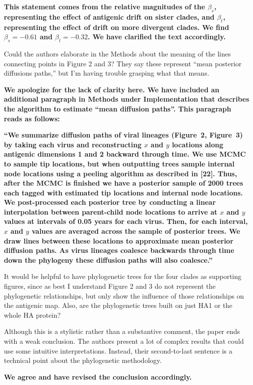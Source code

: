 \documentclass[11pt,oneside,letterpaper]{article}
\begin{document}
\textbf{This statement comes from the relative magnitudes of the $\beta_s$, representing the effect of antigenic drift on sister clades, and $\beta_t$, representing the effect of drift on more divergent clades.  We find $\beta_s = -0.61$ and $\beta_t = -0.32$.  We have clarified the text accordingly.}

Could the authors elaborate in the Methods about the meaning of the lines connecting points in Figure 2 and 3? They say these represent ``mean posterior diffusions paths,'' but I'm having trouble grasping what that means.

\textbf{We apologize for the lack of clarity here.  We have included an additional paragraph in Methods under Implementation that describes the algorithm to estimate ``mean diffusion paths''.  This paragraph reads as follows:}

\textbf{``We summarize diffusion paths of viral lineages (Figure~2, Figure~3) by taking each virus and reconstructing $x$ and $y$ locations along antigenic dimensions 1 and 2 backward through time.
We use MCMC to sample tip locations, but when outputting trees sample internal node locations using a peeling algorithm as described in [22].
Thus, after the MCMC is finished we have a posterior sample of 2000 trees each tagged with estimated tip locations and internal node locations.
We post-processed each posterior tree by conducting a linear interpolation between parent-child node locations to arrive at $x$ and $y$ values at intervals of 0.05 years for each virus.
Then, for each interval, $x$ and $y$ values are averaged across the sample of posterior trees.
We draw lines between these locations to approximate mean posterior diffusion paths.
As virus lineages coalesce backwards through time down the phylogeny these diffusion paths will also coalesce.''}

It would be helpful to have phylogenetic trees for the four clades as supporting figures, since as best I understand Figure 2 and 3 do not represent the phylogenetic relationships, but only show the influence of those relationships on the antigenic map. Also, are the phylogenetic trees built on just HA1 or the whole HA protein?

Although this is a stylistic rather than a substantive comment, the paper ends with a weak conclusion. The authors present a lot of complex results that could use some intuitive interpretations. Instead, their second-to-last sentence is a technical point about the phylogenetic methodology.

\textbf{We agree and have revised the conclusion accordingly.}
\end{document}
